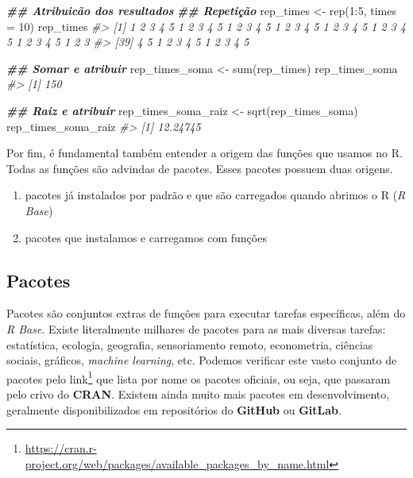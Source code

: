 \documentclass[
]{book}
\newenvironment{Shaded}{\begin{snugshade}}{\end{snugshade}}
\newcommand{\AttributeTok}[1]{\textcolor[rgb]{0.61,0.61,0.61}{#1}}
\newcommand{\CommentTok}[1]{\textcolor[rgb]{0.37,0.37,0.37}{\textit{#1}}}
\newcommand{\DecValTok}[1]{\textcolor[rgb]{0.06,0.06,0.06}{#1}}
\newcommand{\DocumentationTok}[1]{\textcolor[rgb]{0.37,0.37,0.37}{\textbf{\textit{#1}}}}
\newcommand{\FunctionTok}[1]{\textcolor[rgb]{0,0,0}{#1}}
\newcommand{\NormalTok}[1]{#1}
\newcommand{\OtherTok}[1]{\textcolor[rgb]{0.37,0.37,0.37}{#1}}
\newcommand{\SpecialCharTok}[1]{\textcolor[rgb]{0,0,0}{#1}}
\providecommand{\tightlist}{%
  \setlength{\itemsep}{0pt}\setlength{\parskip}{0pt}}
\renewcommand{\href}[2]{#2\footnote{\url{#1}}}
\begin{document}
\begin{Shaded}
\begin{Highlighting}[]
\DocumentationTok{\#\# Atribuicão dos resultados}
\DocumentationTok{\#\# Repetição}
\NormalTok{rep\_times }\OtherTok{\textless{}{-}} \FunctionTok{rep}\NormalTok{(}\DecValTok{1}\SpecialCharTok{:}\DecValTok{5}\NormalTok{, }\AttributeTok{times =} \DecValTok{10}\NormalTok{)}
\NormalTok{rep\_times}
\CommentTok{\#\textgreater{}  [1] 1 2 3 4 5 1 2 3 4 5 1 2 3 4 5 1 2 3 4 5 1 2 3 4 5 1 2 3 4 5 1 2 3 4 5 1 2 3}
\CommentTok{\#\textgreater{} [39] 4 5 1 2 3 4 5 1 2 3 4 5}

\DocumentationTok{\#\# Somar e atribuir}
\NormalTok{rep\_times\_soma }\OtherTok{\textless{}{-}} \FunctionTok{sum}\NormalTok{(rep\_times)}
\NormalTok{rep\_times\_soma}
\CommentTok{\#\textgreater{} [1] 150}

\DocumentationTok{\#\# Raiz e atribuir}
\NormalTok{rep\_times\_soma\_raiz }\OtherTok{\textless{}{-}} \FunctionTok{sqrt}\NormalTok{(rep\_times\_soma)}
\NormalTok{rep\_times\_soma\_raiz}
\CommentTok{\#\textgreater{} [1] 12.24745}
\end{Highlighting}
\end{Shaded}

Por fim, é fundamental também entender a origem das funções que usamos no R. Todas as funções são advindas de pacotes. Esses pacotes possuem duas origens.

\begin{enumerate}
\def\labelenumi{\arabic{enumi}.}
\tightlist
\item
  pacotes já instalados por padrão e que são carregados quando abrimos o R (\emph{R Base})
\item
  pacotes que instalamos e carregamos com funções
\end{enumerate}

\hypertarget{pacotes-1}{%
\subsection{Pacotes}\label{pacotes-1}}

Pacotes são conjuntos extras de funções para executar tarefas específicas, além do \emph{R Base}. Existe literalmente milhares de pacotes para as mais diversas tarefas: estatística, ecologia, geografia, sensoriamento remoto, econometria, ciências sociais, gráficos, \emph{machine learning}, etc. Podemos verificar este vasto conjunto de pacotes pelo \href{https://cran.r-project.org/web/packages/available_packages_by_name.html}{link} que lista por nome os pacotes oficiais, ou seja, que passaram pelo crivo do \textbf{CRAN}. Existem ainda muito mais pacotes em desenvolvimento, geralmente disponibilizados em repositórios do \textbf{GitHub} ou \textbf{GitLab}.
\end{document}
